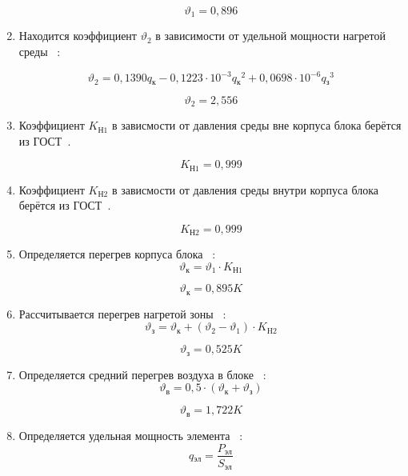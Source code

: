 \begin{enumerate}[label={\arabic*.}]
$$\vartheta_1=0,896$$

\item Находится коэффициент $\vartheta_2$ в зависимости от удельной мощности нагретой среды ~\cite{Rotkop1976}:

\begin{equation}
\vartheta_2 = 0,1390q\mathrm{_к} - 0,1223 \cdot 10^{-3}q\mathrm{_к}^2 + 0,0698 \cdot 10^{-6}q\mathrm{_з}^3
\end{equation}

$$\vartheta_2=2,556$$

\item Коэффициент $K\mathrm{_{Н1}}$ в зависмости от давления
  среды вне корпуса блока берётся из ГОСТ~\cite{GOST_15150-69}.

  $$K\mathrm{_{Н1}} = 0,999$$

  \item Коэффициент $K\mathrm{_{Н2}}$ в зависмости от давления
  среды внутри корпуса блока берётся из ГОСТ~\cite{GOST_15150-69}.

  $$K\mathrm{_{Н2}} = 0,999$$

\item Определяется перегрев корпуса блока ~\cite{Rotkop1976}:
  \begin{equation}
    \vartheta\mathrm{_к} = \vartheta_1 \cdot K\mathrm{_{Н1}}
  \end{equation}
  
  $$\vartheta\mathrm{_к} = 0,895 K$$

\item Рассчитывается перегрев нагретой зоны ~\cite{Rotkop1976}:
    \begin{equation}
    \vartheta\mathrm{_з} = \vartheta\mathrm{_к} + (\vartheta_2 - \vartheta_1) \cdot K\mathrm{_{H2}}
    \end{equation}

    $$\vartheta\mathrm{_з} = 0,525 K$$

  \item Определяется средний перегрев воздуха в блоке ~\cite{Rotkop1976}:
        \begin{equation}
      \vartheta\mathrm{_в} = 0,5 \cdot (\vartheta\mathrm{_к} + \vartheta\mathrm{_з})
    \end{equation}

    $$\vartheta\mathrm{_в} = 1,722 K$$

  \item Определяется удельная мощность элемента ~\cite{Rotkop1976}:
    \begin{equation}
      q\mathrm{_{эл}} = \frac{P_{эл}}{S_{эл}}
    \end{equation}


\end{enumerate}
